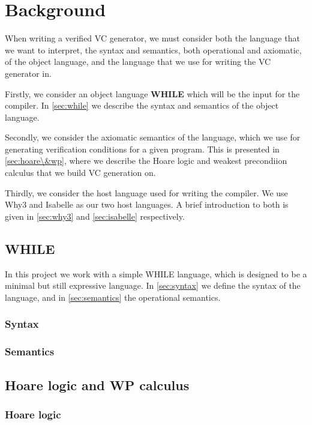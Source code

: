 \section{Background}
When writing a verified VC generator, we must consider both the language that we want to interpret, the syntax and semantics, both operational and axiomatic, of the object language, and the language that we use for writing the VC generator in.

Firstly, we consider an object language \textbf{WHILE} which will be the input for the compiler.
In \autoref{sec:while} we describe the syntax and semantics of the object language.

Secondly, we consider the axiomatic semantics of the language, which we use for generating verification conditions for a given program. This is presented in \autoref{sec:hoare\&wp}, where we describe the Hoare logic and weakest precondiion calculus that we build VC generation on.

Thirdly, we consider the host language used for writing the compiler.
We use Why3 and Isabelle as our two host languages. A brief introduction to both is given in \autoref{sec:why3} and \autoref{sec:isabelle} respectively.

\subsection{WHILE}\label{sec:while}
In this project we work with a simple WHILE language, which is designed to be a minimal but still expressive language.
In \autoref{sec:syntax} we define the syntax of the language, and in \autoref{sec:semantics} the operational semantics.

\subsubsection{Syntax}\label{sec:syntax}

\subsubsection{Semantics}\label{sec:semantics}


\subsection{Hoare logic and WP calculus}\label{sec:hoare\&wp}

\subsubsection{Hoare logic}\label{sec:hoare}


